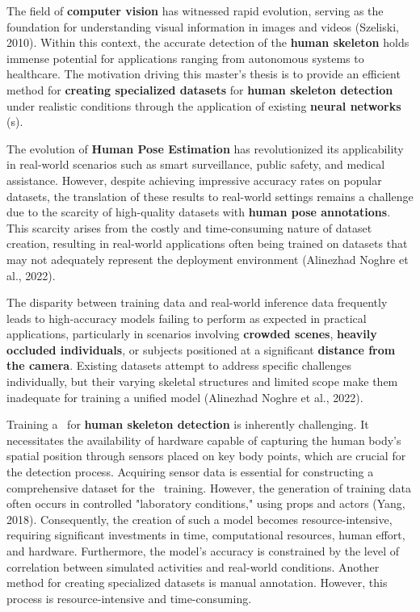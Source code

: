 

The field of {\bf computer vision} has witnessed rapid evolution, serving as the foundation for understanding visual information in images and videos (\scc Szeliski, 2010). Within this context, the accurate detection of the {\bf human skeleton} holds immense potential for applications ranging from autonomous systems to healthcare. The motivation driving this master's thesis is to provide an efficient method for {\bf creating specialized datasets} for {\bf human skeleton detection} under realistic conditions through the application of existing {\bf neural networks} (\NN\-s).

The evolution of {\bf Human Pose Estimation} has revolutionized its applicability in real-world scenarios such as smart surveillance, public safety, and medical assistance. However, despite achieving impressive accuracy rates on popular datasets, the translation of these results to real-world settings remains a challenge due to the scarcity of high-quality datasets with {\bf human pose annotations}. This scarcity arises from the costly and time-consuming nature of dataset creation, resulting in real-world applications often being trained on datasets that may not adequately represent the deployment environment (\scc Alinezhad Noghre et al., 2022).

The disparity between training data and real-world inference data frequently leads to high-accuracy models failing to perform as expected in practical applications, particularly in scenarios involving {\bf crowded scenes}, {\bf heavily occluded individuals}, or subjects positioned at a significant {\bf distance from the camera}. Existing datasets attempt to address specific challenges individually, but their varying skeletal structures and limited scope make them inadequate for training a unified model (\scc Alinezhad Noghre et al., 2022).

Training a \NN\ for {\bf human skeleton detection} is inherently challenging. It necessitates the availability of hardware capable of capturing the human body's spatial position through sensors placed on key body points, which are crucial for the detection process. Acquiring sensor data is essential for constructing a comprehensive dataset for the \NN\ training. However, the generation of training data often occurs in controlled "laboratory conditions," using props and actors (\scc Yang, 2018). Consequently, the creation of such a model becomes resource-intensive, requiring significant investments in time, computational resources, human effort, and hardware. Furthermore, the model's accuracy is constrained by the level of correlation between simulated activities and real-world conditions. Another method for creating specialized datasets is manual annotation. However, this process is resource-intensive and time-consuming.

